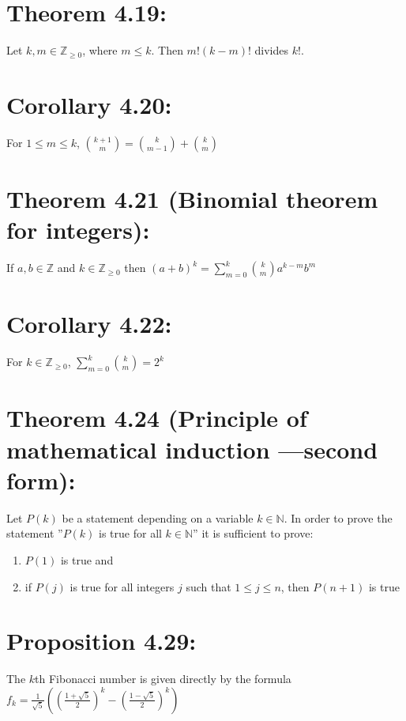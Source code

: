 \section*{Theorem 4.19:}
Let $k,m \in \mathbb{Z}_{\geq 0}$, where $m \leq k$. Then $m!(k-m)!$ divides $k!$.

\section*{Corollary 4.20:}
For $1 \leq m \leq k$,
$\binom{k+1}{m} = \binom{k}{m-1} + \binom{k}{m}$

\section*{Theorem 4.21 (Binomial theorem for integers):}
If $a,b \in \mathbb{Z}$ and $k \in \mathbb{Z}_{\geq 0}$ then
$(a+b)^k = \displaystyle\sum_{m=0}^{k} \binom{k}{m} a^{k-m} b^m$

\section*{Corollary 4.22:}
For $k \in \mathbb{Z}_{\geq 0}$,
$\displaystyle\sum_{m=0}^{k} \binom{k}{m} = 2^k$

\section*{Theorem 4.24 (Principle of mathematical induction —second form):}
Let $P(k)$ be a statement depending on a variable $k \in \mathbb{N}$. In order to prove the statement ”$P(k)$ is true for all $k \in \mathbb{N}$” it is sufficient to prove:
\begin{enumerate}
    \item $P(1)$ is true and
    \item if $P(j)$ is true for all integers $j$ such that $1 \leq j \leq n$, then $P(n+1)$ is true
\end{enumerate}

\section*{Proposition 4.29:}
The $k$th Fibonacci number is given directly by the formula
$f_k = \frac{1}{\sqrt{5}} \left(\left(\frac{1 + \sqrt{5}}{2}\right)^k - \left(\frac{1 - \sqrt{5}}{2}\right)^k\right)$


